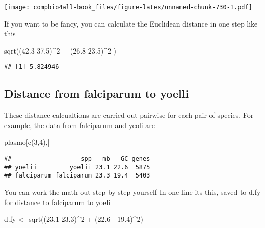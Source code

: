 \documentclass[
]{book}
\newenvironment{Shaded}{\begin{snugshade}}{\end{snugshade}}
\newcommand{\DecValTok}[1]{\textcolor[rgb]{0.00,0.00,0.81}{#1}}
\newcommand{\FloatTok}[1]{\textcolor[rgb]{0.00,0.00,0.81}{#1}}
\newcommand{\FunctionTok}[1]{\textcolor[rgb]{0.00,0.00,0.00}{#1}}
\newcommand{\NormalTok}[1]{#1}
\newcommand{\OtherTok}[1]{\textcolor[rgb]{0.56,0.35,0.01}{#1}}
\newcommand{\SpecialCharTok}[1]{\textcolor[rgb]{0.00,0.00,0.00}{#1}}
\begin{document}
\texttt{[image: compbio4all-book\_files/figure-latex/unnamed-chunk-730-1.pdf]}

If you want to be fancy, you can calculate the Euclidean distance in one step like this

\begin{Shaded}
\begin{Highlighting}[]
\FunctionTok{sqrt}\NormalTok{((}\FloatTok{42.3{-}37.5}\NormalTok{)}\SpecialCharTok{\^{}}\DecValTok{2} \SpecialCharTok{+}\NormalTok{ (}\FloatTok{26.8{-}23.5}\NormalTok{)}\SpecialCharTok{\^{}}\DecValTok{2}\NormalTok{ )}
\end{Highlighting}
\end{Shaded}

\begin{verbatim}
## [1] 5.824946
\end{verbatim}

\hypertarget{distance-from-falciparum-to-yoelli}{%
\subsection{Distance from falciparum to yoelli}\label{distance-from-falciparum-to-yoelli}}

These distance calcualtions are carried out pairwise for each pair of species. For example, the data from falciparum and yeoli are

\begin{Shaded}
\begin{Highlighting}[]
\NormalTok{plasmo[}\FunctionTok{c}\NormalTok{(}\DecValTok{3}\NormalTok{,}\DecValTok{4}\NormalTok{),]}
\end{Highlighting}
\end{Shaded}

\begin{verbatim}
##                   spp   mb   GC genes
## yoelii         yoelii 23.1 22.6  5875
## falciparum falciparum 23.3 19.4  5403
\end{verbatim}

You can work the math out step by step yourself In one line its this, saved to d.fy for distance to falciparum to yoeli

\begin{Shaded}
\begin{Highlighting}[]
\NormalTok{d.fy }\OtherTok{\textless{}{-}} \FunctionTok{sqrt}\NormalTok{((}\FloatTok{23.1{-}23.3}\NormalTok{)}\SpecialCharTok{\^{}}\DecValTok{2} \SpecialCharTok{+}\NormalTok{ (}\FloatTok{22.6} \SpecialCharTok{{-}} \FloatTok{19.4}\NormalTok{)}\SpecialCharTok{\^{}}\DecValTok{2}\NormalTok{)}
\end{Highlighting}
\end{Shaded}
\end{document}
